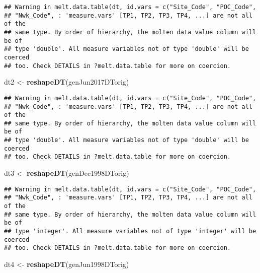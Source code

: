 \documentclass[]{article}
\newenvironment{Shaded}{\begin{snugshade}}{\end{snugshade}}
\newcommand{\KeywordTok}[1]{\textcolor[rgb]{0.13,0.29,0.53}{\textbf{#1}}}
\newcommand{\StringTok}[1]{\textcolor[rgb]{0.31,0.60,0.02}{#1}}
\newcommand{\NormalTok}[1]{#1}
\begin{document}
\begin{verbatim}
## Warning in melt.data.table(dt, id.vars = c("Site_Code", "POC_Code",
## "Nwk_Code", : 'measure.vars' [TP1, TP2, TP3, TP4, ...] are not all of the
## same type. By order of hierarchy, the molten data value column will be of
## type 'double'. All measure variables not of type 'double' will be coerced
## too. Check DETAILS in ?melt.data.table for more on coercion.
\end{verbatim}

\begin{Shaded}
\begin{Highlighting}[]
\NormalTok{dt2 <-}\StringTok{ }\KeywordTok{reshapeDT}\NormalTok{(genJun2017DTorig)}
\end{Highlighting}
\end{Shaded}

\begin{verbatim}
## Warning in melt.data.table(dt, id.vars = c("Site_Code", "POC_Code",
## "Nwk_Code", : 'measure.vars' [TP1, TP2, TP3, TP4, ...] are not all of the
## same type. By order of hierarchy, the molten data value column will be of
## type 'double'. All measure variables not of type 'double' will be coerced
## too. Check DETAILS in ?melt.data.table for more on coercion.
\end{verbatim}

\begin{Shaded}
\begin{Highlighting}[]
\NormalTok{dt3 <-}\StringTok{ }\KeywordTok{reshapeDT}\NormalTok{(genDec1998DTorig)}
\end{Highlighting}
\end{Shaded}

\begin{verbatim}
## Warning in melt.data.table(dt, id.vars = c("Site_Code", "POC_Code",
## "Nwk_Code", : 'measure.vars' [TP1, TP2, TP3, TP4, ...] are not all of the
## same type. By order of hierarchy, the molten data value column will be of
## type 'integer'. All measure variables not of type 'integer' will be coerced
## too. Check DETAILS in ?melt.data.table for more on coercion.
\end{verbatim}

\begin{Shaded}
\begin{Highlighting}[]
\NormalTok{dt4 <-}\StringTok{ }\KeywordTok{reshapeDT}\NormalTok{(genJun1998DTorig)}
\end{Highlighting}
\end{Shaded}
\end{document}
